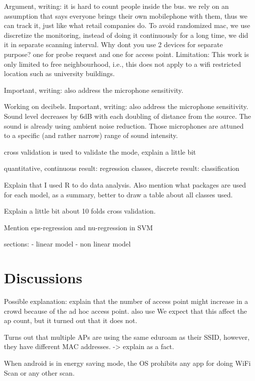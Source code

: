 Argument, writing:
it is hard to count people inside the bus.
we rely on an assumption that says everyone brings their own mobilephone with them, thus we can track it, just like what retail companies do.
To avoid randomized mac, we use discretize the monitoring, instead of doing it continuously for a long time, we did it in separate scanning interval.
Why dont you use 2 devices for separate purpose? one for probe request and one for access point.
Limitation: This work is only limited to free neighbourhood, i.e., this does not apply to a wifi restricted location such as university buildings.

Important, writing: also address the microphone sensitivity.

Working on decibels.
Important, writing: also address the microphone sensitivity.
Sound level decreases by 6dB with each doubling of distance from the source.
The sound is already using ambient noise reduction.
Those microphones are attuned to a specific (and rather narrow) range of sound intensity.

cross validation is used to validate the mode, explain a little bit

quantitative, continuous result: regression
classes, discrete result: classification

Explain that I used R to do data analysis.
Also mention what packages are used for each model, as a summary, better to draw a table about all classes used.

Explain a little bit about 10 folds cross validation.

Mention eps-regression and nu-regression in SVM

sections:
- linear model
- non linear model
\section{Discussions} %
\label{sec:discussions}
Possible explanation: explain that the number of access point might increase in a crowd because of the ad hoc access point.
also use %
We expect that this affect the ap count, but it turned out that it does not.

Turns out that multiple APs are using the same eduroam as their SSID, however, they have different MAC addresses. -> explain as a fact.

When android is in energy saving mode, the OS prohibits any app for doing WiFi Scan or any other scan.

